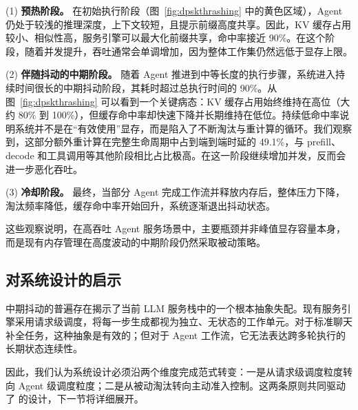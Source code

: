 (1) \noindent\textbf{预热阶段。} 在初始执行阶段（图~\ref{fig:dpskthrashing} 中的黄色区域），Agent 仍处于较浅的推理深度，上下文较短，且提示前缀高度共享。因此，KV 缓存占用较小、相似性高，服务引擎可以最大化前缀共享，命中率接近 90\%。在这个阶段，随着并发提升，吞吐通常会单调增加，因为整体工作集仍然远低于显存上限。

(2) \noindent\textbf{伴随抖动的中期阶段。} 随着 Agent 推进到中等长度的执行步骤，系统进入持续时间很长的中期抖动阶段，其耗时超过总执行时间的 90\%。从图~\ref{fig:dpskthrashing} 可以看到一个关键病态：KV 缓存占用始终维持在高位（大约 80\% 到 100\%），但缓存命中率却快速下降并长期维持在低位。持续低命中率说明系统并不是在“有效使用”显存，而是陷入了不断淘汰与重计算的循环。我们观察到，这部分额外重计算在完整生命周期中占到端到端时延的 49.1\%，与 prefill、decode 和工具调用等其他阶段相比占比极高。在这一阶段继续增加并发，反而会进一步恶化吞吐。

(3) \noindent\textbf{冷却阶段。} 最终，当部分 Agent 完成工作流并释放内存后，整体压力下降，淘汰频率降低，缓存命中率开始回升，系统逐渐退出抖动状态。

这些观察说明，在高吞吐 Agent 服务场景中，主要瓶颈并非峰值显存容量本身，而是现有内存管理在高度波动的中期阶段仍然采取被动策略。

\subsection{对系统设计的启示}

中期抖动的普遍存在揭示了当前 LLM 服务栈中的一个根本抽象失配。现有服务引擎采用请求级调度，将每一步生成都视为独立、无状态的工作单元。对于标准聊天补全任务，这种抽象是有效的；但对于 Agent 工作流，它无法表达跨多轮执行的长期状态连续性。

因此，我们认为系统设计必须沿两个维度完成范式转变：一是从请求级调度粒度转向 Agent 级调度粒度；二是从被动淘汰转向主动准入控制。这两条原则共同驱动了 \SysName{} 的设计，下一节将详细展开。
